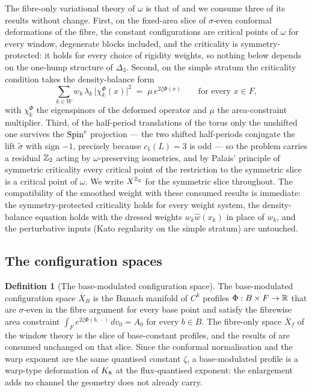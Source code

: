 \documentclass[11pt]{article}
\numberwithin{equation}{section}
\theoremstyle{plain}
\theoremstyle{definition}
\newtheorem{definition}[theorem]{Definition}
\theoremstyle{remark}
\newcommand{\stildec}{\tilde{\sigma}}
\begin{document}
The fibre-only variational theory of $\omega$ is that of
\cite{MEF3} and we consume three of its results without change.
First, on the fixed-area slice of $\sigma$-even conformal
deformations of the fibre, the constant configurations are critical
points of $\omega$ for every window, degenerate blocks included,
and the criticality is symmetry-protected: it holds for every
choice of rigidity weights, so nothing below depends on the
one-hump structure of $\Delta_{3}$. Second, on the simple stratum
the criticality condition takes the density-balance form
\begin{equation}\label{eq:el}
\sum_{k \in W} w_{k}\,\lambda_{k}\,
\bigl|\chi_{k}^{\Phi}(x)\bigr|^{2}
\;=\; \mu\, e^{2\zeta\Phi(x)}
\qquad \text{for every } x \in F,
\end{equation}
with $\chi_{k}^{\Phi}$ the eigenspinors of the deformed operator
and $\mu$ the area-constraint multiplier. Third, of the half-period
translations of the torus only the unshifted one survives the
$\text{Spin}^c$ projection --- the two shifted half-periods conjugate the
lift $\stildec$ with sign $-1$, precisely because $c_{1}(L) = 3$ is
odd --- so the problem carries a residual $\mathbb{Z}_2$ acting by
$\omega$-preserving isometries, and by Palais' principle of
symmetric criticality \cite{Palais1979} every critical point of the
restriction to the symmetric slice is a critical point of $\omega$.
We write $X^{\mathbb{Z}_2}$ for the symmetric slice throughout. The
compatibility of the smoothed weight with these consumed results is
immediate: the symmetry-protected criticality holds for every
weight system, the density-balance equation holds with the dressed
weights $w_{k}\hat{w}(x_{k})$ in place of $w_{k}$, and the
perturbative inputs (Kato regularity on the simple stratum) are
untouched.

\subsection{The configuration spaces}\label{sec:spaces}

\begin{definition}[The base-modulated configuration
space]\label{rb:space}
The base-modulated configuration space $\bar{X}_{B}$ is the Banach
manifold of $C^{k}$ profiles $\Phi : B \times F \to \mathbb{R}$ that are
$\sigma$-even in the fibre argument for every base point and
satisfy the fibrewise area constraint
$\int_{F} e^{2\zeta\Phi(b,\,\cdot)}\, dv_{0} = A_{0}$ for every
$b \in B$. The fibre-only space $\bar{X}_{f}$ of the window theory
is the slice of base-constant profiles, and the results of
\cite{MEF3} are consumed unchanged on that slice. Since the
conformal normalisation and the warp exponent are the same
quantised constant $\zeta$, a base-modulated profile is a warp-type
deformation of $K_8$ at the flux-quantised exponent: the
enlargement adds no channel the geometry does not already carry.
\end{definition}
\end{document}
